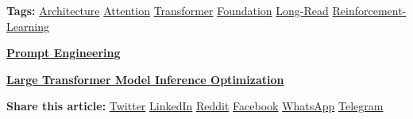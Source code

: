 \documentclass[12pt]{article}
\begin{document}
\vspace{2em}
\noindent
\textbf{Tags:}
\href{https://lilianweng.github.io/tags/architecture/}{Architecture} \quad
\href{https://lilianweng.github.io/tags/attention/}{Attention} \quad
\href{https://lilianweng.github.io/tags/transformer/}{Transformer} \quad
\href{https://lilianweng.github.io/tags/foundation/}{Foundation} \quad
\href{https://lilianweng.github.io/tags/long-read/}{Long-Read} \quad
\href{https://lilianweng.github.io/tags/reinforcement-learning/}{Reinforcement-Learning}

\vspace{2em}
\noindent
\begin{minipage}{0.48\textwidth}
    \raggedright
    \textbf{\href{https://lilianweng.github.io/posts/2023-03-15-prompt-engineering/}{\textlangle\quad Prompt Engineering}}
\end{minipage}
\hfill
\begin{minipage}{0.48\textwidth}
    \raggedleft
    \textbf{\href{https://lilianweng.github.io/posts/2023-01-10-inference-optimization/}{Large Transformer Model Inference Optimization \quad\textrangle}}
\end{minipage}
\vspace{2em}

\begin{center}
  \vspace{1em}
  \textbf{Share this article:}
  \href{https://twitter.com/intent/tweet/?text=The%20Transformer%20Family%20Version%202.0&url=https%3a%2f%2flilianweng.github.io%2fposts%2f2023-01-27-the-transformer-family-v2%2f&hashtags=architecture,attention,transformer,foundation,long-read,reinforcement-learning}{Twitter} \textbar{}
  \href{https://www.linkedin.com/shareArticle?mini=true&url=https%3a%2f%2flilianweng.github.io%2fposts%2f2023-01-27-the-transformer-family-v2%2f&title=The%20Transformer%20Family%20Version%202.0&summary=The%20Transformer%20Family%20Version%202.0&source=https%3a%2f%2flilianweng.github.io%2fposts%2f2023-01-27-the-transformer-family-v2%2f}{LinkedIn} \textbar{}
  \href{https://reddit.com/submit?url=https%3a%2f%2flilianweng.github.io%2fposts%2f2023-01-27-the-transformer-family-v2%2f&title=The%20Transformer%20Family%20Version%202.0}{Reddit} \textbar{}
  \href{https://facebook.com/sharer/sharer.php?u=https%3a%2f%2flilianweng.github.io%2fposts%2f2023-01-27-the-transformer-family-v2%2f}{Facebook} \textbar{}
  \href{https://api.whatsapp.com/send?text=The%20Transformer%20Family%20Version%202.0%20-%20https%3a%2f%2flilianweng.github.io%2fposts%2f2023-01-27-the-transformer-family-v2%2f}{WhatsApp} \textbar{}
  \href{https://telegram.me/share/url?text=The%20Transformer%20Family%20Version%202.0&url=https%3a%2f%2flilianweng.github.io%2fposts%2f2023-01-27-the-transformer-family-v2%2f}{Telegram}
\end{center}
\end{document}
